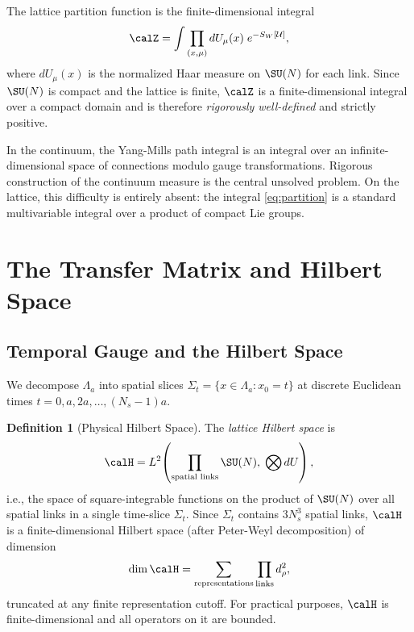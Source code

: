 \documentclass[12pt, a4paper]{article}
\theoremstyle{plain}
\theoremstyle{definition}
\newtheorem{definition}[theorem]{Definition}
\begin{document}
The lattice partition function is the finite-dimensional integral
\begin{equation}\label{eq:partition}
  \calZ = \int \prod_{(x,\mu)} dU_\mu(x) \; e^{-S_W[\mathcal{U}]},
\end{equation}
where $dU_\mu(x)$ is the normalized Haar measure on $\SU(N)$ for each link.
Since $\SU(N)$ is compact and the lattice is finite, $\calZ$ is a
finite-dimensional integral over a compact domain and is therefore
\emph{rigorously well-defined} and strictly positive.

\begin{remark}
  In the continuum, the Yang-Mills path integral is an integral over an
  infinite-dimensional space of connections modulo gauge transformations.
  Rigorous construction of the continuum measure is the central
  unsolved problem. On the lattice, this difficulty is entirely absent:
  the integral \eqref{eq:partition} is a standard multivariable integral
  over a product of compact Lie groups.
\end{remark}

\section{The Transfer Matrix and Hilbert Space}\label{sec:transfer}

\subsection{Temporal Gauge and the Hilbert Space}

We decompose $\Lambda_a$ into spatial slices $\Sigma_t = \{x \in \Lambda_a :
x_0 = t\}$ at discrete Euclidean times $t = 0, a, 2a, \ldots, (N_s-1)a$.

\begin{definition}[Physical Hilbert Space]\label{def:hilbert}
  The \emph{lattice Hilbert space} is
  \begin{equation}
    \calH = L^2\!\left(\prod_{\text{spatial links}} \SU(N), \;
    \bigotimes dU\right),
  \end{equation}
  i.e., the space of square-integrable functions on the product of $\SU(N)$
  over all spatial links in a single time-slice $\Sigma_t$. Since $\Sigma_t$
  contains $3 N_s^3$ spatial links, $\calH$ is a finite-dimensional Hilbert
  space (after Peter-Weyl decomposition) of dimension
  \begin{equation}
    \dim \calH = \sum_{\text{representations}} \prod_{\text{links}} d_\rho^2,
  \end{equation}
  truncated at any finite representation cutoff. For practical purposes,
  $\calH$ is finite-dimensional and all operators on it are bounded.
\end{definition}
\end{document}
